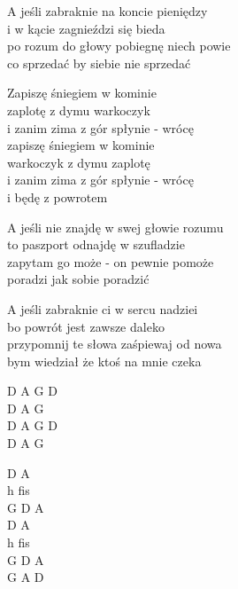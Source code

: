 \begin{text}
    A jeśli zabraknie na koncie pieniędzy\\
    i w kącie zagnieździ się bieda\\
    po rozum do głowy pobiegnę niech powie\\
    co sprzedać by siebie nie sprzedać

    \vin Zapiszę śniegiem w kominie\\
    \vin zaplotę z dymu warkoczyk\\
    \vin i zanim zima z gór spłynie - wrócę\\
    \vin zapiszę śniegiem w kominie\\
    \vin warkoczyk z dymu zaplotę\\
    \vin i zanim zima z gór spłynie - wrócę\\
    \vin i będę z powrotem

    A jeśli nie znajdę w swej głowie rozumu\\
    to paszport odnajdę w szufladzie\\
    zapytam go może - on pewnie pomoże\\
    poradzi jak sobie poradzić

    A jeśli zabraknie ci w sercu nadziei\\
    bo powrót jest zawsze daleko\\
    przypomnij te słowa zaśpiewaj od nowa\\
    bym wiedział że ktoś na mnie czeka
\end{text}
\begin{chord}
    D A G D\\
    D A G\\
    D A G D\\
    D A G

    D A\\
    h fis\\
    G D A\\
    D A\\
    h fis\\
    G D A\\
    G A D
\end{chord}